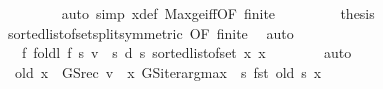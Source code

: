 \begin{isabellebody}
\ \ \ \ \ \ \ \ \isamarkupfalse%
\ {\isacharparenleft}{\kern0pt}auto\ simp{\isacharcolon}{\kern0pt}\ x{\isacharprime}{\kern0pt}{\isacharunderscore}{\kern0pt}def\ Max{\isacharunderscore}{\kern0pt}ge{\isacharunderscore}{\kern0pt}iff{\isacharbrackleft}{\kern0pt}OF\ finite\ {\isacharasterisk}{\kern0pt}{\isacharbrackright}{\kern0pt}{\isacharparenright}{\kern0pt}\isanewline
\ \ \ \ \ \ \isamarkupfalse%
\ {\isacharquery}{\kern0pt}thesis\isanewline
\ \ \ \ \ \ \ \ \isamarkupfalse%
\ {\isacharasterisk}{\kern0pt}{\isacharasterisk}{\kern0pt}\ sorted{\isacharunderscore}{\kern0pt}list{\isacharunderscore}{\kern0pt}of{\isacharunderscore}{\kern0pt}set{\isacharunderscore}{\kern0pt}split{\isacharbrackleft}{\kern0pt}symmetric{\isacharcomma}{\kern0pt}\ OF\ finite{\isacharbrackright}{\kern0pt}\ \isamarkupfalse%
\ auto\isanewline
\ \ \ \ \isamarkupfalse%
\isanewline
\ \ \ \ \isamarkupfalse%
\ \isamarkupfalse%
\ {\isachardoublequoteopen}{\isasymdots}\ \ {\isacharequal}{\kern0pt}\ {\isacharquery}{\kern0pt}f\ {\isacharparenleft}{\kern0pt}foldl\ {\isacharquery}{\kern0pt}f\ {\isacharparenleft}{\kern0pt}{\isasymlambda}s{\isachardot}{\kern0pt}\ {\isacharparenleft}{\kern0pt}v\ {\isachardollar}{\kern0pt}\ s{\isacharcomma}{\kern0pt}\ d\ s{\isacharparenright}{\kern0pt}{\isacharparenright}{\kern0pt}\ {\isacharparenleft}{\kern0pt}sorted{\isacharunderscore}{\kern0pt}list{\isacharunderscore}{\kern0pt}of{\isacharunderscore}{\kern0pt}set\ {\isacharbraceleft}{\kern0pt}{\isachardot}{\kern0pt}{\isachardot}{\kern0pt}x{\isacharprime}{\kern0pt}{\isacharbraceright}{\kern0pt}{\isacharparenright}{\kern0pt}{\isacharparenright}{\kern0pt}\ x{\isachardoublequoteclose}\isanewline
\ \ \ \ \ \ \isamarkupfalse%
\ auto\isanewline
\ \ \ \ \isamarkupfalse%
\ \isamarkupfalse%
\ {\isachardoublequoteopen}{\isasymdots}\ {\isacharequal}{\kern0pt}\ {\isacharparenleft}{\kern0pt}{\isacharquery}{\kern0pt}old\ {\isacharparenleft}{\kern0pt}x\ {\isacharcolon}{\kern0pt}{\isacharequal}{\kern0pt}\ {\isacharparenleft}{\kern0pt}GS{\isacharunderscore}{\kern0pt}rec\ v\ {\isachardollar}{\kern0pt}\ x{\isacharcomma}{\kern0pt}\ GS{\isacharunderscore}{\kern0pt}iter{\isacharunderscore}{\kern0pt}arg{\isacharunderscore}{\kern0pt}max\ {\isacharparenleft}{\kern0pt}{\isasymchi}\ s{\isachardot}{\kern0pt}\ fst\ {\isacharparenleft}{\kern0pt}{\isacharquery}{\kern0pt}old\ s{\isacharparenright}{\kern0pt}{\isacharparenright}{\kern0pt}\ x{\isacharparenright}{\kern0pt}{\isacharparenright}{\kern0pt}{\isacharparenright}{\kern0pt}{\isachardoublequoteclose}\isanewline

\end{isabellebody}
